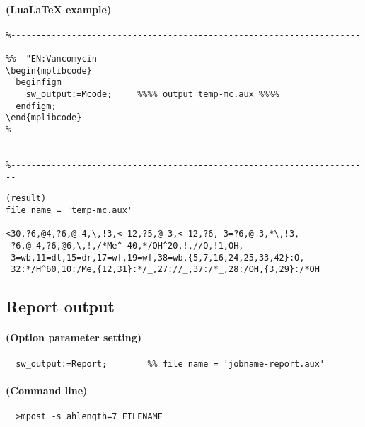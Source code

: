 \documentclass[a4paper]{article}
\begin{document}
\paragraph{(LuaLaTeX example)}
\begin{verbatim}
%-----------------------------------------------------------------------
%%  "EN:Vancomycin
\begin{mplibcode}
  beginfigm
    sw_output:=Mcode;     %%%% output temp-mc.aux %%%%
  endfigm;
\end{mplibcode}
%-----------------------------------------------------------------------

%-----------------------------------------------------------------------
\end{verbatim}
\begin{verbatim}
(result)
file name = 'temp-mc.aux'

<30,?6,@4,?6,@-4,\,!3,<-12,?5,@-3,<-12,?6,-3=?6,@-3,*\,!3,
 ?6,@-4,?6,@6,\,!,/*Me^-40,*/OH^20,!,//O,!1,OH,
 3=wb,11=dl,15=dr,17=wf,19=wf,38=wb,{5,7,16,24,25,33,42}:O,
 32:*/H^60,10:/Me,{12,31}:*/_,27://_,37:/*_,28:/OH,{3,29}:/*OH
\end{verbatim}
\newpage
\noindent%
\subsection{Report output}
\paragraph{(Option parameter setting)}
%
%
\begin{verbatim}
  sw_output:=Report;        %% file name = 'jobname-report.aux'
\end{verbatim}
\paragraph{(Command line)}
\begin{verbatim}
  >mpost -s ahlength=7 FILENAME
\end{verbatim}
\end{document}
